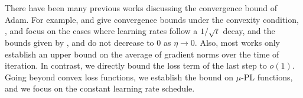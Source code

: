 There have been many previous works discussing the convergence bound of Adam. For example, \citet{reddi2018convergence} and \citet{dereich2024convergence} give convergence bounds under the convexity condition, \citet{zou2019sufficient}, \citet{shi2021rmsprop} and \citet{zhang2022adam} focus on the cases where learning rates follow a $1/\sqrt{t}$ decay, and the bounds given by \citet{NEURIPS2018_90365351}, \citet{zhang2022adam} and \citet{10.1145/3637528.3671718} do not decrease to $0$ as $\eta \to 0$. Also, most works \citep{defossez2020simple, guo2025unifiedconvergenceanalysisadaptive, iiduka2022theoreticalanalysisadamusing, wang2024convergenceadamnonuniformsmoothness, zhang2024convergence, hong2023highprobabilityconvergenceadam} only establish an upper bound on the average of gradient norms over the time of iteration. In contrast, we directly bound the loss term of the last step to $o(1)$. Going beyond convex loss functions, we establish the bound on $\mu$-PL functions, and we focus on the constant learning rate schedule.
